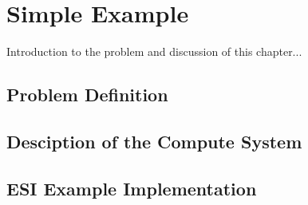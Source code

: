 \chapter{Simple Example}

Introduction to the problem and discussion of this chapter...

\section{Problem Definition}

\section{Desciption of the Compute System}

\section{ESI Example Implementation}
